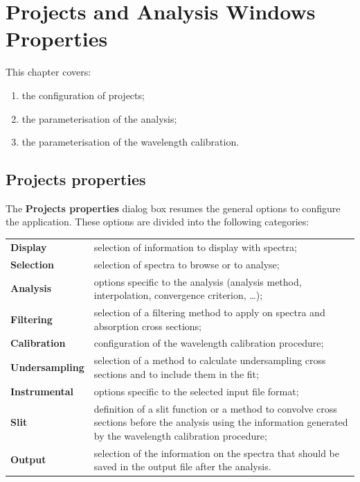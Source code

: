 \chapter{Projects and Analysis Windows Properties} \label{cha:properties}
This chapter covers:

\begin{enumerate} \itemsep -6pt
\item the configuration of projects;
\item the parameterisation of the analysis;
\item the parameterisation of the wavelength calibration.
\end{enumerate}

\section{Projects properties}\label{sec:projects-properties}
The \textbf{Projects properties} dialog box resumes the general options to configure the application.  These options are divided into the following categories:

\begin{longtable}[h]{l p{8cm}}
\textbf{Display}	& selection of information to display with spectra; \\ [6pt]
\textbf{Selection}	& selection of spectra to browse or to analyse; \\ [6pt]
\textbf{Analysis}	& options specific to the analysis (analysis method, interpolation, convergence criterion, \dots); \\ [6pt]
\textbf{Filtering}	& selection of a filtering method to apply on spectra and absorption cross sections; \\ [6pt]
\textbf{Calibration}	& configuration of the wavelength calibration procedure; \\ [6pt]
\textbf{Undersampling}	& selection of a method to calculate undersampling cross sections and to include them in the fit; \\ [6pt]
\textbf{Instrumental}	& options specific to the selected input file format; \\ [6pt]
\textbf{Slit} 	& definition of a slit function or a method to convolve cross sections before the analysis using the information generated by the wavelength calibration procedure; \\ [6pt]
\textbf{Output}	& selection of the information on the spectra that should be saved in the output file after the analysis. \\ [6pt]
\end{longtable}

